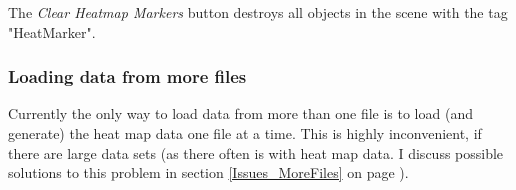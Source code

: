 The \textit{Clear Heatmap Markers} button destroys all objects in the scene with the tag "HeatMarker". 

\subsubsection{Loading data from more files}
Currently the only way to load data from more than one file is to load (and generate) the heat map data one file at a time. This is highly inconvenient, if there are large data sets (as there often is with heat map data. I discuss possible solutions to this problem in section \ref{Issues_MoreFiles} on page \pageref{Issues_MoreFiles}).